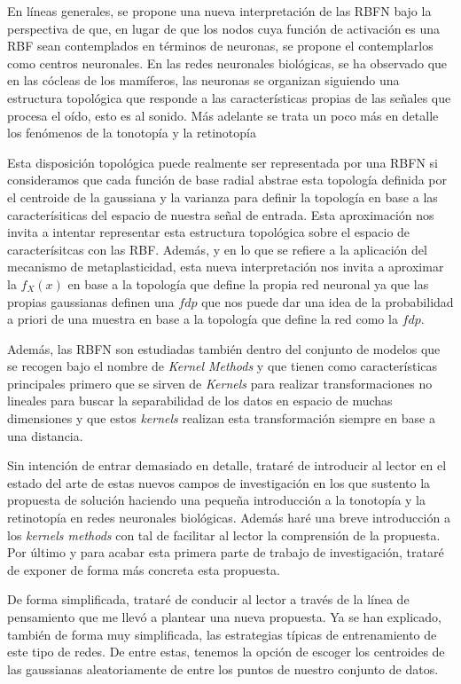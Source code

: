 \documentclass[10pt,a4paper]{report}
\begin{document}
En líneas generales, se propone una nueva interpretación de las RBFN bajo la perspectiva de que, en lugar de que los nodos cuya función de activación es una RBF sean contemplados en términos de neuronas, se propone el contemplarlos como centros neuronales. En las redes neuronales biológicas, se ha observado que en las cócleas de los mamíferos, las neuronas se organizan siguiendo una estructura topológica que responde a las características propias de las señales que procesa el oído, esto es al sonido. Más adelante se trata un poco más en detalle los fenómenos de la tonotopía y la retinotopía

Esta disposición topológica puede realmente ser representada por una RBFN si consideramos que cada función de base radial abstrae esta topología definida por el centroide de la gaussiana y la varianza para definir la topología en base a las caracterísiticas del espacio de nuestra señal de entrada. Esta aproximación nos invita a intentar representar esta estructura topológica sobre el espacio de caracterísitcas con las RBF. Además, y en lo que se refiere a la aplicación del mecanismo de metaplasticidad, esta nueva interpretación nos invita a aproximar la $f_X(x)$ en base a la topología que define la propia red neuronal ya que las propias gaussianas definen una $fdp$ que nos puede dar una idea de la probabilidad a priori de una muestra en base a la topología que define la red como la $fdp$.

Además, las RBFN son estudiadas también dentro del conjunto de modelos que se recogen bajo el nombre de \textit{Kernel Methods} y que tienen como características principales primero que se sirven de \textit{Kernels} para realizar transformaciones no lineales para buscar la separabilidad de los datos en espacio de muchas dimensiones y que estos \textit{kernels} realizan esta transformación siempre en base a una distancia.

Sin intención de entrar demasiado en detalle, trataré de introducir al lector en el estado del arte de estas nuevos campos de investigación en los que sustento la propuesta de solución haciendo una pequeña introducción a la tonotopía y la retinotopía en redes neuronales biológicas. Además haré una breve introducción a los \textit{kernels methods} con tal de facilitar al lector la comprensión de la propuesta. Por último y para acabar esta primera parte de trabajo de investigación, trataré de exponer de forma más concreta esta propuesta.

De forma simplificada, trataré de conducir al lector a través de la línea de pensamiento que me llevó a plantear una nueva propuesta. Ya se han explicado, también de forma muy simplificada, las estrategias típicas de entrenamiento de este tipo de redes. De entre estas, tenemos la opción de escoger los centroides de las gaussianas aleatoriamente de entre los puntos de nuestro conjunto de datos.
\end{document}
